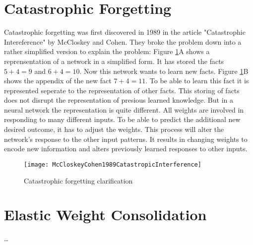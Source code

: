 \section{Catastrophic Forgetting}

Catastrophic forgetting was first discovered in 1989 in the article "Catastrophic Intereference" by McCloskey and Cohen.
They broke the problem down into a rather simplified version to explain the problem:
Figure \ref{fig:catastrophic_forgetting_clarification}A shows a reprensentation of a network in a simplified form.
It has stored the facts $5 + 4 = 9$ and $6 + 4 = 10$.
\hfill \break
Now this network wants to learn new facts.
Figure \ref{fig:catastrophic_forgetting_clarification}B shows the appendix of the new fact $7 + 4 = 11$.
To be able to learn this fact it is represented seperate to the representation of other facts.
This storing of facts does not disrupt the representation of presious learned knowledge.
\hfill \break
But in a neural network the representation is quite different.
All weights are involved in responding to many different inputs.
To be able to predict the additional new desired outcome, it has to adjust the weights.
This process will alter the network's response to the other input patterns.
It results in changing weights to encode new information and alters previously learned responses to other inputs.

\begin{figure}[H]
    \centering
    \texttt{[image: McCloskeyCohen1989CatastropicInterference]}
    \caption{\cite[page 148]{psychology_learning_mccloskey_cohen} Catastrophic forgetting clarification}
    \label{fig:catastrophic_forgetting_clarification}
\end{figure}


\section{Elastic Weight Consolidation}

…